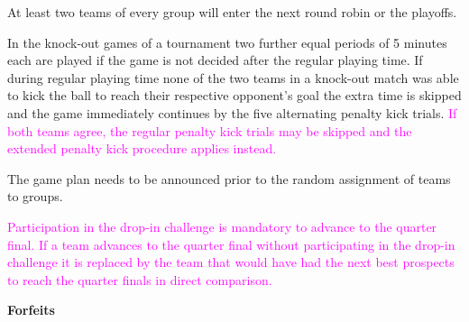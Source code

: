\bigskip

At least two teams of every group will enter the next round robin or the playoffs.

\bigskip

In the knock-out games of a tournament two further equal periods of 5 minutes each are played if the game is not decided after the regular playing time.  If during regular playing time none of the two teams in a knock-out match was able to kick the ball to reach their respective opponent's goal the extra time is skipped and the game immediately continues by the five alternating penalty kick trials. \textcolor{magenta}{If both teams agree, the regular penalty kick trials may be skipped and the extended penalty kick procedure applies instead.}

\bigskip


The game plan needs to be announced prior to the random assignment of teams to groups.


\bigskip

\textcolor{magenta}{Participation in the drop-in challenge is mandatory to advance to the quarter final. If a team advances to the quarter final without participating in the drop-in challenge it is replaced by the team that would have had the next best prospects to reach the quarter finals in direct comparison.}

\bigskip

{\bfseries Forfeits}

\headlinebox

